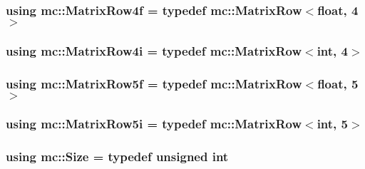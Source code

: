 \subsubsection[{\texorpdfstring{Matrix\+Row4f}{MatrixRow4f}}]{\setlength{\rightskip}{0pt plus 5cm}using {\bf mc\+::\+Matrix\+Row4f} = typedef {\bf mc\+::\+Matrix\+Row}$<$float, 4$>$}\hypertarget{namespacemc_ac76f1616fbf0b724f9a8b957b2635475}{}\label{namespacemc_ac76f1616fbf0b724f9a8b957b2635475}
\subsubsection[{\texorpdfstring{Matrix\+Row4i}{MatrixRow4i}}]{\setlength{\rightskip}{0pt plus 5cm}using {\bf mc\+::\+Matrix\+Row4i} = typedef {\bf mc\+::\+Matrix\+Row}$<$int, 4$>$}\hypertarget{namespacemc_ae0265bef81dbac954f173a2408c9ce60}{}\label{namespacemc_ae0265bef81dbac954f173a2408c9ce60}
\subsubsection[{\texorpdfstring{Matrix\+Row5f}{MatrixRow5f}}]{\setlength{\rightskip}{0pt plus 5cm}using {\bf mc\+::\+Matrix\+Row5f} = typedef {\bf mc\+::\+Matrix\+Row}$<$float, 5$>$}\hypertarget{namespacemc_a2dc58d627f7c4287360df5a1852050d4}{}\label{namespacemc_a2dc58d627f7c4287360df5a1852050d4}
\subsubsection[{\texorpdfstring{Matrix\+Row5i}{MatrixRow5i}}]{\setlength{\rightskip}{0pt plus 5cm}using {\bf mc\+::\+Matrix\+Row5i} = typedef {\bf mc\+::\+Matrix\+Row}$<$int, 5$>$}\hypertarget{namespacemc_a458456087c23e1a0463a13c566050b0b}{}\label{namespacemc_a458456087c23e1a0463a13c566050b0b}
\subsubsection[{\texorpdfstring{Size}{Size}}]{\setlength{\rightskip}{0pt plus 5cm}using {\bf mc\+::\+Size} = typedef unsigned int}\hypertarget{namespacemc_ad1c06461067735b3b17e0df612532c4e}{}\label{namespacemc_ad1c06461067735b3b17e0df612532c4e}
